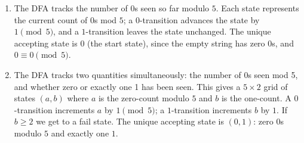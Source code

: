 \documentclass[12pt]{article}
\begin{document}
\begin{solution}
    \bbni 
    \begin{enumerate}
        \item The DFA tracks the number of $0$s seen so far modulo $5$. Each state represents the current count of $0$s mod $5$; a $0$-transition advances the state by $1 \pmod 5$, and a $1$-transition leaves the state unchanged. The unique accepting state is $0$ (the start state), since the empty string has zero $0$s, and $0 \equiv 0 \pmod 5$. 

        
        


        \newpage 
        \item The DFA tracks two quantities simultaneously: the number of 0s seen mod 5, and whether zero or exactly one 1 has been seen. This gives a $5 \times 2$ grid of states $(a, b)$ where  $a$ is the zero-count modulo $5$ and $b$ is the one-count. A $0$-transition increments $a$ by $1 \pmod 5$; a $1$-transition increments $b$ by $1$. If $b \geq 2$ we get to a fail state. The unique accepting state is $(0,1)$: zero $0$s modulo $5$ and exactly one $1$.

        


\end{enumerate}
\end{solution}
\end{document}
